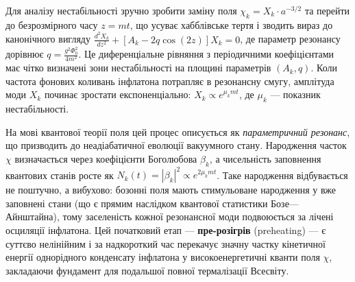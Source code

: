 Для аналізу нестабільності зручно зробити заміну поля $\chi_k = X_k \cdot a^{-3/2}$ та перейти до безрозмірного часу $z = mt$, що усуває хабблівське тертя і зводить вираз до канонічного вигляду $\frac{d^2 X_k}{dz^2} + [A_k - 2q\cos(2z)]X_k = 0$, де параметр резонансу дорівнює $q = \frac{g^2\Phi_0^2}{4m^2}$. Це диференціальне рівняння з періодичними коефіцієнтами має чітко визначені зони нестабільності на площині параметрів $(A_k, q)$. Коли частота фонових коливань інфлатона потрапляє в резонансну смугу, амплітуда моди $X_k$ починає зростати експоненціально: $X_k \propto e^{\mu_k mt}$, де $\mu_k$ --- показник нестабільності.

На мові квантової теорії поля цей процес описується як \emph{параметричний резонанс}, що призводить до неадіабатичної еволюції вакуумного стану. Народження часток $\chi$ визначається через коефіцієнти Боголюбова $\beta_k$, а чисельність заповнення квантових станів росте як $N_k(t) = |\beta_k|^2 \propto e^{2\mu_k mt}$. Таке народження відбувається не поштучно, а вибухово: бозонні поля мають стимульоване народження у вже заповнені стани (що є прямим наслідком квантової статистики Бозе---Айнштайна), тому заселеність кожної резонансної моди подвоюється за лічені осциляції інфлатона. Цей початковий етап --- \textbf{пре-розігрів} (preheating) --- є суттєво нелінійним і за надкороткий час перекачує значну частку кінетичної енергії однорідного конденсату інфлатона у високоенергетичні кванти поля $\chi$, закладаючи фундамент для подальшої повної термалізації Всесвіту.


